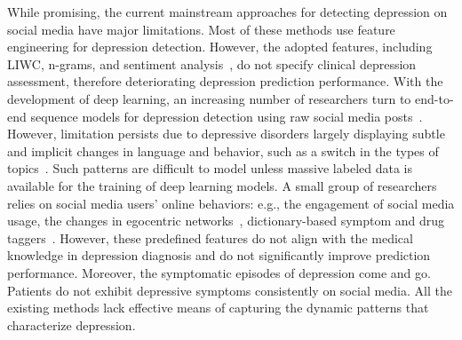 While promising, the current mainstream approaches for detecting depression on social media have major limitations. Most of these methods use feature engineering for depression detection. However, the adopted features, including LIWC, n-grams, and sentiment analysis~\citep{gautier_environmental_2017}, do not specify clinical depression assessment, therefore deteriorating depression prediction performance. With the development of deep learning, an increasing number of researchers turn to end-to-end sequence models for depression detection using raw social media posts~\citep{lin_first_2020}. However, limitation persists due to depressive disorders largely displaying subtle and implicit changes in language and behavior, such as a switch in the types of topics~\citep{coppersmith_measuring_2014,coppersmith_quantifying_2014}. Such patterns are difficult to model unless massive labeled data is available for the training of deep learning models. A small group of researchers relies on social media users' online behaviors: e.g., the engagement of social media usage, the changes in egocentric networks~, dictionary-based symptom and drug taggers~\citep{hussain_exploring_2020}. However, these predefined features do not align with the medical knowledge in depression diagnosis and do not significantly improve prediction performance. Moreover, the symptomatic episodes of depression come and go. Patients do not exhibit depressive symptoms consistently on social media. All the existing methods lack effective means of capturing the dynamic patterns that characterize depression.


